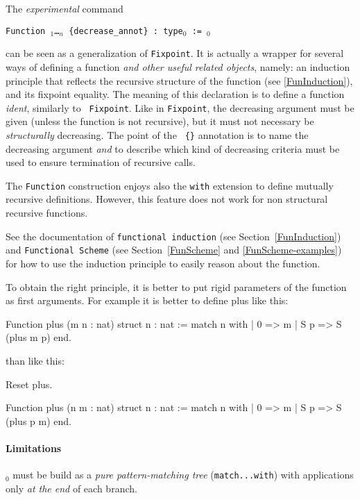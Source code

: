 The \emph{experimental} command 
\begin{center}
   \texttt{Function {\ident} {\binder$_1$}\ldots{\binder$_n$}
     \{decrease\_annot\} : type$_0$ := \term$_0$}
   \label{Function}
\end{center}
can be seen as a generalization of {\tt Fixpoint}.  It is actually a
wrapper for several ways of defining a function \emph{and other useful
  related objects}, namely: an induction principle that reflects the
recursive structure of the function (see \ref{FunInduction}), and its
fixpoint equality.  The meaning of this
declaration is to define a function {\it ident}, similarly to {\tt
  Fixpoint}. Like in {\tt Fixpoint}, the decreasing argument must be
given (unless the function is not recursive), but it must not
necessary be \emph{structurally} decreasing. The point of the {\tt
  \{\}} annotation is to name the decreasing argument \emph{and} to
describe which kind of decreasing criteria must be used to ensure
termination of recursive calls.

The {\tt Function} construction enjoys also the {\tt with} extension
to define mutually recursive definitions. However, this feature does
not work for non structural recursive functions. %

See the documentation of {\tt functional induction}
(see Section~\ref{FunInduction}) and {\tt Functional Scheme}
(see Section~\ref{FunScheme} and \ref{FunScheme-examples}) for how to use the
induction principle to easily reason about the function.

 To obtain the right principle, it is better
to put rigid parameters of the function as first arguments. For
example it is better to define plus like this:

\begin{coq_example*}
Function plus (m n : nat) {struct n} : nat :=
  match n with
  | 0 => m
  | S p => S (plus m p)
  end.
\end{coq_example*}
\noindent than like this:
\begin{coq_eval}
Reset plus.
\end{coq_eval}
\begin{coq_example*}
Function plus (n m : nat) {struct n} : nat :=
  match n with
  | 0 => m
  | S p => S (plus p m)
  end.
\end{coq_example*}

\paragraph[Limitations]{Limitations\label{sec:Function-limitations}}
\term$_0$ must be build as a \emph{pure pattern-matching tree}
(\texttt{match...with}) with applications only \emph{at the end} of
each branch.  

